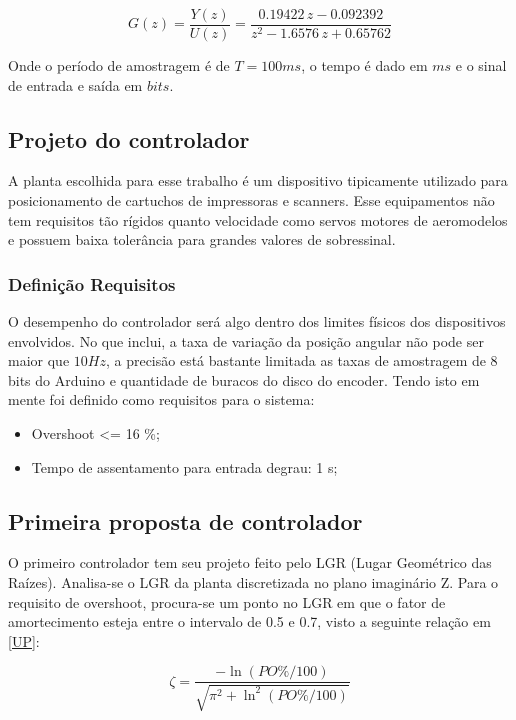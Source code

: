 \documentclass[a4paper,11pt]{article}
\begin{document}
\begin{equation}
G(z) = \frac{Y(z)}{U(z)} = \frac{0.19422\,z-0.092392}{z^2-1.6576\,z+0.65762}
\label{transfdisc}
\end{equation}

Onde o período de amostragem é de $T = 100 ms$, o tempo é dado em $ms$ e o sinal de entrada e saída em $bits$.

\subsection{Projeto do controlador}

A planta escolhida para esse trabalho é um dispositivo tipicamente utilizado para posicionamento de cartuchos de impressoras e scanners. Esse equipamentos não tem requisitos tão rígidos quanto velocidade como servos motores de aeromodelos e possuem baixa tolerância para grandes valores de sobressinal. 

\subsubsection{Definição Requisitos}

O desempenho do controlador será algo dentro dos limites físicos dos dispositivos envolvidos. No que inclui, a taxa de variação da posição angular não pode ser maior que $10Hz$, a precisão está bastante limitada as taxas de amostragem de 8 bits do Arduino e quantidade de buracos do disco do encoder. Tendo isto em mente foi definido como requisitos para o sistema:

\begin{itemize}
   \item Overshoot <= 16 \%;
   \item Tempo de assentamento para entrada degrau: 1 s;
 \end{itemize}

\subsection{Primeira proposta de controlador}

O primeiro controlador tem seu projeto feito pelo LGR (Lugar Geométrico das Raízes). Analisa-se o LGR da planta discretizada no plano imaginário Z. Para o requisito de overshoot, procura-se um ponto no LGR em que o fator de amortecimento esteja entre o intervalo de 0.5 e 0.7, visto a seguinte relação em \ref{UP}:

\begin{equation}
\zeta=\frac{-\ln \left(P O\% / 100\right)}{\sqrt{\pi^{2}+\ln ^{2}\left(P O\% / 100\right)}}
\label{UP}
\end{equation}
\end{document}
